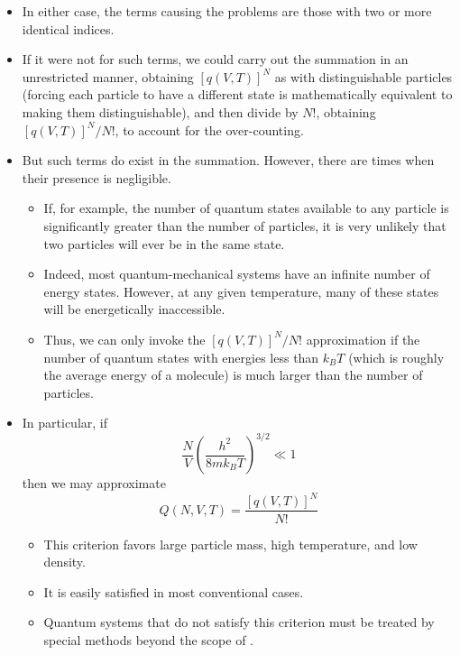 \documentclass[../notes.tex]{subfiles}
\begin{document}
\begin{itemize}
\begin{itemize}
\begin{itemize}
        \end{itemize}
        \item In either case, the terms causing the problems are those with two or more identical indices.
        \item If it were not for such terms, we could carry out the summation in an unrestricted manner, obtaining $[q(V,T)]^N$ as with distinguishable particles (forcing each particle to have a different state is mathematically equivalent to making them distinguishable), and then divide by $N!$, obtaining $[q(V,T)]^N/N!$, to account for the over-counting.
        \item But such terms do exist in the summation. However, there are times when their presence is negligible.
        \begin{itemize}
            \item If, for example, the number of quantum states available to any particle is significantly greater than the number of particles, it is very unlikely that two particles will ever be in the same state.
            \item Indeed, most quantum-mechanical systems have an infinite number of energy states. However, at any given temperature, many of these states will be energetically inaccessible.
            \item Thus, we can only invoke the $[q(V,T)]^N/N!$ approximation if the number of quantum states with energies less than $k_BT$ (which is roughly the average energy of a molecule) is much larger than the number of particles.
        \end{itemize}
        \item In particular, if
        \begin{equation*}
            \frac{N}{V}\left( \frac{h^2}{8mk_BT} \right)^{3/2} \ll  1
        \end{equation*}
        then we may approximate
        \begin{equation*}
            Q(N,V,T) = \frac{[q(V,T)]^N}{N!}
        \end{equation*}
        \begin{itemize}
            \item This criterion favors large particle mass, high temperature, and low density.
            \item It is easily satisfied in most conventional cases.
            \item Quantum systems that do not satisfy this criterion must be treated by special methods beyond the scope of \textcite{bib:McQuarrieSimon}.

\end{itemize}
\end{itemize}
\end{itemize}
\end{document}
